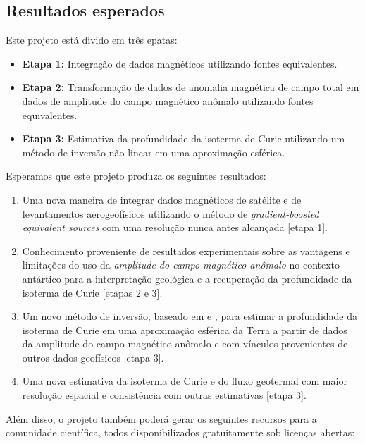 \documentclass[11pt,a4paper,oneside]{book}
\begin{document}
\subsection{Resultados esperados}

Este projeto está divido em três epatas:

\begin{itemize}
  \item \textbf{Etapa 1:} Integração de dados magnéticos utilizando fontes
    equivalentes.
  \item \textbf{Etapa 2:} Transformação de dados de anomalia magnética de campo
    total em dados de amplitude do campo magnético anômalo utilizando fontes
    equivalentes.
  \item \textbf{Etapa 3:} Estimativa da profundidade da isoterma de Curie
    utilizando um método de inversão não-linear em uma aproximação esférica.
\end{itemize}

\noindent
Esperamos que este projeto produza os seguintes resultados:

\begin{enumerate}
  \item Uma nova maneira de integrar dados magnéticos de satélite e de
    levantamentos aerogeofísicos utilizando o método de
    \textit{gradient-boosted equivalent sources} \citep{Soler2021} com uma
    resolução nunca antes alcançada [etapa 1].
  \item Conhecimento proveniente de resultados experimentais sobre as vantagens
    e limitações do uso da \textit{amplitude do campo magnético anômalo} no
    contexto antártico para a interpretação geológica \citep{Melo2021} e a
    recuperação da profundidade da isoterma de Curie \citep{HidalgoGato2021}
    [etapas 2 e 3].
  \item Um novo método de inversão, baseado em \citet{Uieda2017} e
    \citet{HidalgoGato2021}, para estimar a profundidade da isoterma de Curie
    em uma aproximação esférica da Terra a partir de dados da amplitude do
    campo magnético anômalo e com vínculos provenientes de outros dados
    geofísicos [etapa 3].
  \item Uma nova estimativa da isoterma de Curie e do fluxo geotermal com maior
    resolução espacial e consistência com outras estimativas [etapa 3].
\end{enumerate}

\noindent
Além disso, o projeto também poderá gerar os seguintes recursos para a
comunidade científica, todos disponibilizados gratuitamente sob licenças
abertas:
\end{document}
